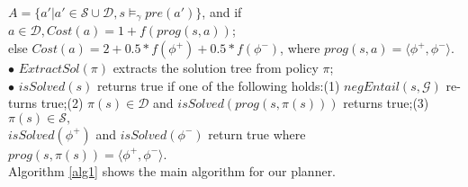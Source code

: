 \documentclass{llncs}
\begin{document}
\hspace*{0.1in}\hspace{0.1in} $A=\{a'|a'\in\mathcal{S}\cup\mathcal{D}, s\models_\gamma pre(a')\}$, and if $a\in\mathcal{D}, Cost(a)=1+f(prog(s,a)) $;\\
\hspace*{0.1in}\hspace{0.1in} else $Cost(a)=2+0.5*f(\phi^+)+0.5*f(\phi^-)$, where $prog(s, a)=\langle \phi^+,\phi^-\rangle$.\\
\hspace*{0.1in}$\bullet$ $ExtractSol(\pi)$ extracts the solution tree from policy $\pi$;\\
\hspace*{0.1in}$\bullet$ $isSolved(s)$ returns true if one of the following holds:(1) $negEntail(s, \mathcal{G})$ re-\\
\hspace*{0.1in}\hspace{0.1in}turns true;(2) $\pi(s)\in\mathcal{D}$ and $isSolved(prog(s,\pi(s)))$ returns true;(3) $\pi(s)\in\mathcal{S},$\\
\hspace*{0.1in}\hspace{0.1in}$isSolved(\phi^+)$ and $isSolved(\phi^-)$ return true where $prog(s,\pi(s)) = \langle\phi^+,\phi^-\rangle$.\\
Algorithm \ref{alg1} shows the main algorithm for our planner.
\end{document}
